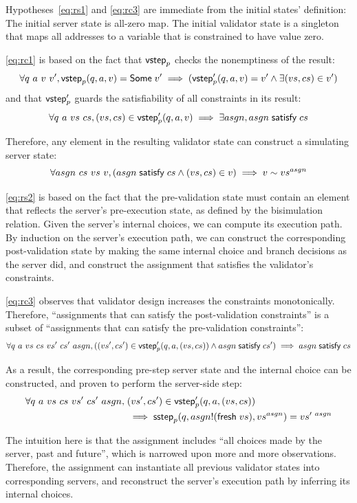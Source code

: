 Hypotheses~\ref{eq:rs1} and \ref{eq:rc3} are immediate from the initial states'
definition: The initial server state is all-zero map.  The initial validator
state is a singleton that maps all addresses to a variable that is constrained
to have value zero.

\autoref{eq:rc1} is based on the fact that $\mathsf{vstep}_p$ checks the nonemptiness of
the result:
\[\forall q~a~v~v',\mathsf{vstep}_p(q,a,v)=\mathsf{Some}\;v'\implies(\mathsf{vstep}_p'(q,a,v)=v'\wedge\exists (vs,cs)\in v')\]
and that $\mathsf{vstep}_p'$ guards the satisfiability of all constraints in its result:
\[\forall q~a~vs~cs,{(vs,cs)}\in\mathsf{vstep}_p'(q,a,v)\implies\exists asgn,asgn\;\mathsf{satisfy}\;cs\]

Therefore, any element in the resulting validator state can construct a
simulating server state:
\[\forall asgn~cs~vs~v,(asgn\;\mathsf{satisfy}\;cs\wedge(vs,cs)\in v)\implies v\sim vs^{asgn}\]

\autoref{eq:rs2} is based on the fact that the pre-validation state must contain
an element that reflects the server's pre-execution state, as defined by the
bisimulation relation.  Given the server's internal choices, we can compute its
execution path.  By induction on the server's execution path, we can construct
the corresponding post-validation state by making the same internal choice and
branch decisions as the server did, and construct the assignment that satisfies
the validator's constraints.

\autoref{eq:rc3} observes that validator design increases the constraints
monotonically.  Therefore, ``assignments that can satisfy the post-validation
constraints'' is a subset of ``assignments that can satisfy the pre-validation
constraints'':
\[\forall q~a~vs~cs~vs'~cs'~asgn,((vs',cs')\in\mathsf{vstep}_p'(q,a,(vs,cs))\wedge asgn\;\mathsf{satisfy}\;cs')\implies asgn\;\mathsf{satisfy}\;cs\]

As a result, the corresponding pre-step server state and the internal choice can
be constructed, and proven to perform the server-side step:
\begin{align*}
\forall q~a~vs~cs~vs'~cs'~asgn,\;&(vs',cs')\in\mathsf{vstep}_p'(q,a,(vs,cs))\\
&\implies\mathsf{sstep}_p(q,asgn!(\mathsf{fresh}\;{vs}),vs^{asgn})=vs'^{~asgn}
\end{align*}

The intuition here is that the assignment includes ``all choices made by the
server, past and future'', which is narrowed upon more and more observations.
Therefore, the assignment can instantiate all previous validator states into
corresponding servers, and reconstruct the server's execution path by inferring
its internal choices.
